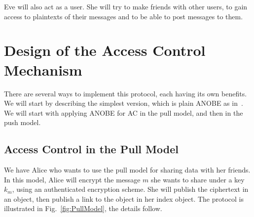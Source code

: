Eve will also act as a user.
She will try to make friends with other users, to gain access to plaintexts of 
their messages and to be able to post messages to them.


\section{Design of the Access Control Mechanism}\label{sec:Design}

There are several ways to implement this protocol, each having its own benefits.
We will start by describing the simplest version, which is plain \ac{ANOBE} as 
in~\cite{ANOBE}.
We will start with applying \ac{ANOBE} for \ac{AC} in the pull model, and then in the push model.

\subsection{Access Control in the Pull Model}\label{sec:PullModelAC}

We have Alice who wants to use the pull model for sharing data with her 
friends.
In this model, Alice will encrypt the message \(m\) she wants to share under 
a key \(k_m\), using an authenticated encryption scheme.
She will publish the ciphertext in an object, then publish a link to the object 
in her index object.
The protocol is illustrated in Fig.~\ref{fig:PullModel}, the details follow.

